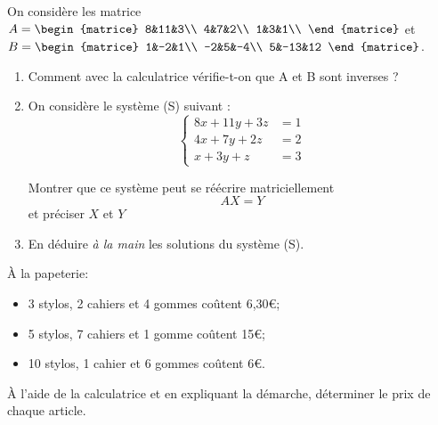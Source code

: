 \begin{exercice}[ : À la calculatrice]
	
	On considère les matrice $A=\begin{matrice}
			8&11&3\\
			4&7&2\\
			1&3&1\\
		\end{matrice}$ et $B=\begin{matrice}
			1&-2&1\\
			-2&5&-4\\
			5&-13&12
		\end{matrice}$.
	
	\begin{enumerate}
		\item 	Comment avec la calculatrice vérifie-t-on que A et B sont inverses ?
		\item 	On considère le système (S) suivant :
		      $$\begin{cases}
				      8x+11y+3z & =1 \\
				      4x+7y+2z  & =2 \\
				      x+3y+z    & =3
			      \end{cases}$$
		      
		      Montrer que ce système peut se réécrire matriciellement $$AX=Y$$ et préciser $X$ et $Y$
		\item 	En déduire \textit{à la main} les solutions du système (S).\\
	\end{enumerate}
	
\end{exercice}

\begin{exercice}
	À la papeterie:
	\begin{itemize}
		\item 	3 stylos, 2 cahiers et 4 gommes coûtent 6,30€;
		\item 	5 stylos, 7 cahiers et 1 gomme coûtent 15€;
		\item 	10 stylos, 1 cahier et 6 gommes coûtent 6€.
	\end{itemize}
	À l'aide de la calculatrice et en expliquant la démarche, déterminer le prix de chaque article.
\end{exercice}

